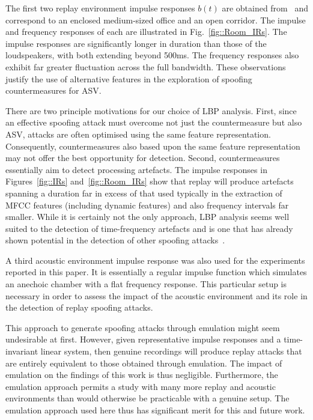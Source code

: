 The first two replay environment impulse responses $b(t)$ are obtained from~\cite{Jeub2009} and correspond to an enclosed medium-sized office and an open corridor.  The impulse and frequency responses of each are illustrated in Fig.~\ref{fig::Room_IRs}.  The impulse responses are significantly longer in duration than those of the loudspeakers, with both extending beyond 500ms.  The frequency responses also exhibit far greater fluctuation across the full bandwidth.  These observations justify the use of alternative features in the exploration of spoofing countermeasures for ASV.  

There are two principle motivations for our choice of LBP analysis.  First, since an effective spoofing attack must overcome not just the countermeasure but also ASV, attacks are often optimised using the same feature representation.  Consequently, countermeasures also based upon the same feature representation may not offer the best opportunity for detection.  Second, countermeasures essentially aim to detect processing artefacts.  The impulse responses in Figures~\ref{fig::IRs} and~\ref{fig::Room_IRs} show that replay will produce artefacts spanning a duration far in excess of that used typically in the extraction of MFCC features (including dynamic features) and also frequency intervals far smaller.  While it is certainly not the only approach, LBP analysis seems well suited to the detection of time-frequency artefacts and is one that has already shown potential in the detection of other spoofing attacks~\cite{Alegre2013a,AlegreBTAS2013}.  

A third acoustic environment impulse response was also used for the experiments reported in this paper.  It is essentially a regular impulse function which simulates an anechoic chamber with a flat frequency response.  This particular setup is necessary in order to assess the impact of the acoustic environment and its role in the detection of replay spoofing attacks.

This approach to generate spoofing attacks through emulation might seem undesirable at first.  However, given representative impulse responses and a time-invariant linear system, then genuine recordings will produce replay attacks that are entirely equivalent to those obtained through emulation.  The impact of emulation on the findings of this work is thus negligible.  Furthermore, the emulation approach permits a study with many more replay and acoustic environments than would otherwise be practicable with a genuine setup.  The emulation approach used here thus has significant merit for this and future work.



